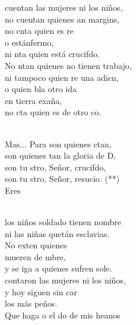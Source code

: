 \documentclass[12pt]{article}
\begin{document}
\begin{multicols*}{2}
\begin{cancion}%
	cuentan las mujeres ni los niños,\\
	no cuentan quienes an margins,\\
	no cnta quien es re \\
	o estánfermo,\\
	ni nta quien está crucifdo.\\
\jump
	No ntan quienes no tienen trabajo,\\
	ni tampoco quien re una adicn, \\
	o quien bla otro ida \\
	en tierra exaña,\\
	no cta quien es de otro co.\\\jump\\
	\begin{chorus}%
	Mas... Para  son quienes ctan,\\
	son quienes tan la gloria de D,\\
	son tu stro, Señor, crucifdo,\\
	son tu stro, Señor, resucio. (**)\\
	Eres  \\
	\end{chorus}%
	\jump\\
	los niños soldado tienen nombre\\
	ni las niñas quetán esclavias.\\
	No exten quienes \\
	 mueren de mbre,\\
	y se iga a quienes sufren sole.\\
\jump
	contaron las mujeres ni los niños,\\
	y hoy siguen sin car \\
	los más peños.\\
	Que haga o el do de mis heanos \\

\end{cancion}
\end{multicols*}
\end{document}
